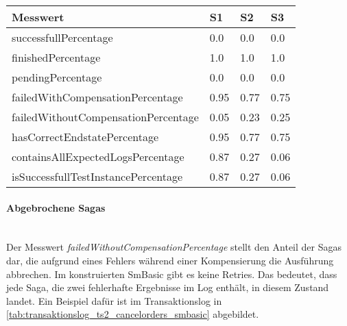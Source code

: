 \begin{center}
	\fontsize{9}{12}\selectfont
	\begin{longtable}[h]{|p{5cm}|p{1cm}|p{1cm}|p{1cm}|}
		\hline
		Messwert & S1 & S2 & S3 \\ \hline
		\endhead
		\endfoot
		successfull\-Percentage & 0.0 & 0.0 & 0.0 \\ \hline
		finished\-Percentage & 1.0 & 1.0 & 1.0 \\ \hline
		pending\-Percentage & 0.0 & 0.0 & 0.0 \\ \hline
		failedWithCompensation\-Percentage & 0.95 & 0.77 & 0.75 \\ \hline
		failedWithoutCompensation\-Percentage & 0.05 & 0.23 & 0.25 \\ \hline
		hasCorrectEndstate\-Percentage & 0.95 & 0.77 & 0.75 \\ \hline
		containsAllExpectedLogs\-Percentage & 0.87 & 0.27 & 0.06 \\ \hline
		isSuccessfullTestInstance\-Percentage & 0.87 & 0.27 & 0.06 \\ \hline
	\end{longtable}
\end{center}
\FloatBarrier

\paragraph*{Abgebrochene Sagas} \mbox{}\\
Der Messwert \textit{failedWithoutCompensationPercentage} stellt den Anteil der Sagas dar, die aufgrund eines Fehlers während einer Kompensierung die Ausführung abbrechen. Im konstruierten SmBasic gibt es keine Retries. Das bedeutet, dass jede Saga, die zwei fehlerhafte Ergebnisse im Log enthält, in diesem Zustand landet. Ein Beispiel dafür ist im Transaktionslog in \cref{tab:transaktionslog_ts2_cancelorders_smbasic} abgebildet. 

